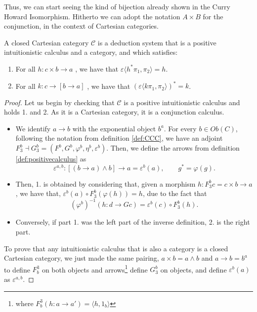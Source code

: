Thus, we can start seeing the kind of bijection already shown in the Curry Howard Isomorphism. Hitherto we can adopt the notation $A\times B$ for the conjunction, in the context of Cartesian categories.
\begin{proposition}\label{def2:CCC}
  A closed Cartesian category $\mathcal{C}$ is a deduction system that is a positive intuitionistic calculus and a category, and which satisfies:
  \begin{enumerate}
  \item   For all $h: c\times b \to a$ , we have that $\varepsilon \langle h^* \pi_1, \pi_2\rangle = h$.
  \item   For all $k: c\to [b \to a]$ , we have that $(\varepsilon \langle k \pi_1, \pi_2\rangle)^* = k$.
  \end{enumerate}
\end{proposition}

\begin{proof}
  
  Let us begin by checking that $\mathcal{C}$ is a positive intuitionistic calculus and holds 1. and 2. As it is a Cartesian category, it is a conjunction calculus.
  \begin{itemize}
  \item We identify $a\to b$ with the exponential object $b^a$. For every $b\in Ob(C)$, following the notation from definition \ref{def:CCC}, we have an adjoint $F_3^b\dashv G_3^b = (F^b,G^b,\varphi^b,\eta^b,\varepsilon^b)$. Then, we define the arrows from definition \ref{def:positivecalculus} as
    $$\varepsilon^{a,b}: [(b \to a) \land b]\to a = \varepsilon^b(a), \qquad g^* = \varphi(g).$$
  \item Then, 1. is obtained by considering that, given a morphism $h: F_3^b c = c\times b \to a$, we have that, $\varepsilon^b(a) \circ F_3^b(\varphi(h)) = h$, due to the fact that $$(\varphi^b)^{-1}(h: d \to Gc) = \varepsilon^b(c)\circ F_3^b(h).$$
  \item Conversely, if part 1. was the left part of the inverse definition, 2. is the right part.
  \end{itemize}

  To prove that any intuitionistic calculus that is also a category is a closed Cartesian category, we just made the same pairing, $a\times b = a\land b$ and $a\to b = b^a$ to define $F_b^3$ on both objects and arrows\footnote{where $F_b^3(h:a\to a') = \langle h, 1_b\rangle $} define $G_3^b$ on objects, and define $\varepsilon^b(a)$ as $\varepsilon^{a,b}$.
\end{proof}







